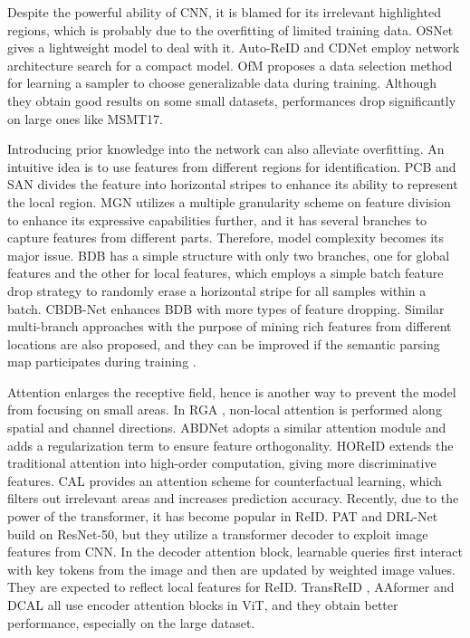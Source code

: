 \documentclass[letterpaper]{article} \usepackage{aaai23}  \usepackage{times}  \usepackage{helvet}  \usepackage{courier}  \usepackage[hyphens]{url}  \usepackage{graphicx} \urlstyle{rm} \def\UrlFont{\rm}  \usepackage{natbib}  \usepackage{caption} \frenchspacing  \setlength{\pdfpagewidth}{8.5in}  \setlength{\pdfpageheight}{11in}  \usepackage{algorithm}
\begin{document}
Despite the powerful ability of CNN, it is blamed for its irrelevant highlighted regions, which is probably due to the overfitting of limited training data. OSNet \cite{OSNeT} gives a lightweight model to deal with it. Auto-ReID \cite{AutoREID} and CDNet \cite{CDNet} employ network architecture search for a compact model. OfM \cite{OFM} proposes a data selection method for learning a sampler to choose generalizable data during training. Although they obtain good results on some small datasets, performances drop significantly on large ones like MSMT17. 

Introducing prior knowledge into the network can also alleviate overfitting. An intuitive idea is to use features from different regions for identification. PCB \cite{PCB} and SAN \cite{SAN} divides the feature into horizontal stripes to enhance its ability to represent the local region. MGN \cite{MGN} utilizes a multiple granularity scheme on feature division to enhance its expressive capabilities further, and it has several branches to capture features from different parts. Therefore, model complexity becomes its major issue. BDB \cite{dai2019batch} has a simple structure with only two branches, one for global features and the other for local features, which employs a simple batch feature drop strategy to randomly erase a horizontal stripe for all samples within a batch. CBDB-Net \cite{CBDB-Net} enhances BDB with more types of feature dropping. Similar multi-branch approaches \cite{hardmix, LTReID, ALDER, PRN, PGAN, CFVMNet} with the purpose of mining rich features from different locations are also proposed, and they can be improved if the semantic parsing map participates during training \cite{SAN-person, ISP, PVEN, SPAN}. 

Attention enlarges the receptive field, hence is another way to prevent the model from focusing on small areas. In RGA \cite{RGA}, non-local attention is performed along spatial and channel directions. ABDNet \cite{ABD-Net} adopts a similar attention module and adds a regularization term to ensure feature orthogonality. HOReID \cite{HOReID} extends the traditional attention into high-order computation, giving more discriminative features. CAL \cite{CAL} provides an attention scheme for counterfactual learning, which filters out irrelevant areas and increases prediction accuracy. Recently, due to the power of the transformer, it has become popular in ReID. PAT \cite{PAT} and DRL-Net \cite{DRL-Net} build on ResNet-50, but they utilize a transformer decoder to exploit image features from CNN. In the decoder attention block, learnable queries first interact with key tokens from the image and then are updated by weighted image values. They are expected to reflect local features for ReID. TransReID \cite{transreid}, AAformer \cite{AAformer} and DCAL \cite{DCAL} all use encoder attention blocks in ViT, and they obtain better performance, especially on the large dataset. 
\end{document}

